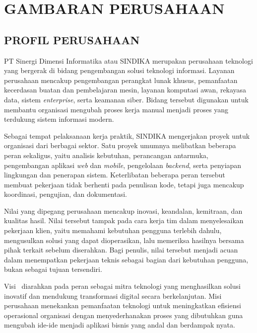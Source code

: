 \chapter{GAMBARAN PERUSAHAAN}

\section{PROFIL PERUSAHAAN}

PT Sinergi Dimensi Informatika atau SINDIKA merupakan perusahaan teknologi yang bergerak di bidang pengembangan solusi teknologi informasi. Layanan perusahaan mencakup pengembangan perangkat lunak khusus, pemanfaatan kecerdasan buatan dan pembelajaran mesin, layanan komputasi awan, rekayasa data, sistem \textit{enterprise}, serta keamanan siber. Bidang tersebut digunakan untuk membantu organisasi mengubah proses kerja manual menjadi proses yang terdukung sistem informasi modern.

Sebagai tempat pelaksanaan kerja praktik, SINDIKA mengerjakan proyek untuk organisasi dari berbagai sektor. Satu proyek umumnya melibatkan beberapa peran sekaligus, yaitu analisis kebutuhan, perancangan antarmuka, pengembangan aplikasi \textit{web} dan \textit{mobile}, pengelolaan \textit{backend}, serta penyiapan lingkungan dan penerapan sistem. Keterlibatan beberapa peran tersebut membuat pekerjaan tidak berhenti pada penulisan kode, tetapi juga mencakup koordinasi, pengujian, dan dokumentasi.

Nilai yang dipegang perusahaan mencakup inovasi, keandalan, kemitraan, dan kualitas hasil. Nilai tersebut tampak pada cara kerja tim dalam menyelesaikan pekerjaan klien, yaitu memahami kebutuhan pengguna terlebih dahulu, mengusulkan solusi yang dapat dioperasikan, lalu memeriksa hasilnya bersama pihak terkait sebelum diserahkan. Bagi penulis, nilai tersebut menjadi acuan dalam menempatkan pekerjaan teknis sebagai bagian dari kebutuhan pengguna, bukan sebagai tujuan tersendiri.

Visi \NamaPerusahaan\ diarahkan pada peran sebagai mitra teknologi yang menghasilkan solusi inovatif dan mendukung transformasi digital secara berkelanjutan. Misi perusahaan menekankan pemanfaatan teknologi untuk meningkatkan efisiensi operasional organisasi dengan menyederhanakan proses yang dibutuhkan guna mengubah ide-ide menjadi aplikasi bisnis yang andal dan berdampak nyata.

